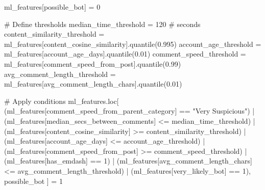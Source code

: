 \documentclass[
  12pt,
  letterpaper,
  DIV=11,
  numbers=noendperiod]{scrartcl}
\newenvironment{Shaded}{\begin{snugshade}}{\end{snugshade}}
\newcommand{\CommentTok}[1]{\textcolor[rgb]{0.37,0.37,0.37}{#1}}
\newcommand{\DecValTok}[1]{\textcolor[rgb]{0.68,0.00,0.00}{#1}}
\newcommand{\FloatTok}[1]{\textcolor[rgb]{0.68,0.00,0.00}{#1}}
\newcommand{\NormalTok}[1]{\textcolor[rgb]{0.00,0.23,0.31}{#1}}
\newcommand{\OperatorTok}[1]{\textcolor[rgb]{0.37,0.37,0.37}{#1}}
\newcommand{\StringTok}[1]{\textcolor[rgb]{0.13,0.47,0.30}{#1}}
\begin{document}
\begin{Shaded}
\begin{Highlighting}[]
\NormalTok{ml\_features[}\StringTok{\textquotesingle{}possible\_bot\textquotesingle{}}\NormalTok{] }\OperatorTok{=} \DecValTok{0}

\CommentTok{\# Define thresholds}
\NormalTok{median\_time\_threshold }\OperatorTok{=} \DecValTok{120}  \CommentTok{\# seconds}
\NormalTok{content\_similarity\_threshold }\OperatorTok{=}\NormalTok{ ml\_features[}\StringTok{\textquotesingle{}content\_cosine\_similarity\textquotesingle{}}\NormalTok{].quantile(}\FloatTok{0.995}\NormalTok{)}
\NormalTok{account\_age\_threshold }\OperatorTok{=}\NormalTok{ ml\_features[}\StringTok{\textquotesingle{}account\_age\_days\textquotesingle{}}\NormalTok{].quantile(}\FloatTok{0.01}\NormalTok{)}
\NormalTok{comment\_speed\_threshold }\OperatorTok{=}\NormalTok{ ml\_features[}\StringTok{\textquotesingle{}comment\_speed\_from\_post\textquotesingle{}}\NormalTok{].quantile(}\FloatTok{0.99}\NormalTok{)}
\NormalTok{avg\_comment\_length\_threshold }\OperatorTok{=}\NormalTok{ ml\_features[}\StringTok{\textquotesingle{}avg\_comment\_length\_chars\textquotesingle{}}\NormalTok{].quantile(}\FloatTok{0.01}\NormalTok{)}

\CommentTok{\# Apply conditions}
\NormalTok{ml\_features.loc[}
\NormalTok{    (ml\_features[}\StringTok{\textquotesingle{}comment\_speed\_from\_parent\_category\textquotesingle{}}\NormalTok{] }\OperatorTok{==} \StringTok{"Very Suspicious"}\NormalTok{) }\OperatorTok{|}
\NormalTok{    (ml\_features[}\StringTok{\textquotesingle{}median\_secs\_between\_comments\textquotesingle{}}\NormalTok{] }\OperatorTok{\textless{}=}\NormalTok{ median\_time\_threshold) }\OperatorTok{|}
\NormalTok{    (ml\_features[}\StringTok{\textquotesingle{}content\_cosine\_similarity\textquotesingle{}}\NormalTok{] }\OperatorTok{\textgreater{}=}\NormalTok{ content\_similarity\_threshold) }\OperatorTok{|}
\NormalTok{    (ml\_features[}\StringTok{\textquotesingle{}account\_age\_days\textquotesingle{}}\NormalTok{] }\OperatorTok{\textless{}=}\NormalTok{ account\_age\_threshold) }\OperatorTok{|}
\NormalTok{    (ml\_features[}\StringTok{\textquotesingle{}comment\_speed\_from\_post\textquotesingle{}}\NormalTok{] }\OperatorTok{\textgreater{}=}\NormalTok{ comment\_speed\_threshold) }\OperatorTok{|}
\NormalTok{    (ml\_features[}\StringTok{\textquotesingle{}has\_emdash\textquotesingle{}}\NormalTok{] }\OperatorTok{==} \DecValTok{1}\NormalTok{) }\OperatorTok{|}
\NormalTok{    (ml\_features[}\StringTok{\textquotesingle{}avg\_comment\_length\_chars\textquotesingle{}}\NormalTok{] }\OperatorTok{\textless{}=}\NormalTok{ avg\_comment\_length\_threshold) }\OperatorTok{|}
\NormalTok{    (ml\_features[}\StringTok{\textquotesingle{}very\_likely\_bot\textquotesingle{}}\NormalTok{] }\OperatorTok{==} \DecValTok{1}\NormalTok{),}
    \StringTok{\textquotesingle{}possible\_bot\textquotesingle{}}
\NormalTok{] }\OperatorTok{=} \DecValTok{1}


\end{Highlighting}
\end{Shaded}
\end{document}
